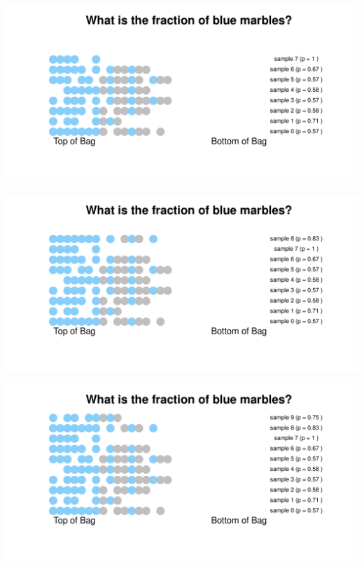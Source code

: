 \documentclass[aspectratio=169]{beamer}
\theoremstyle{principle}
\begin{document}
\begin{frame}
\begin{center}
\includegraphics[scale=0.57]{bias_sample_7.pdf}
\end{center}
\end{frame}

\begin{frame}
\begin{center}
\includegraphics[scale=0.57]{bias_sample_8.pdf}
\end{center}
\end{frame}

\begin{frame}
\begin{center}
\includegraphics[scale=0.57]{bias_sample_9.pdf}
\end{center}
\end{frame}
\end{document}

